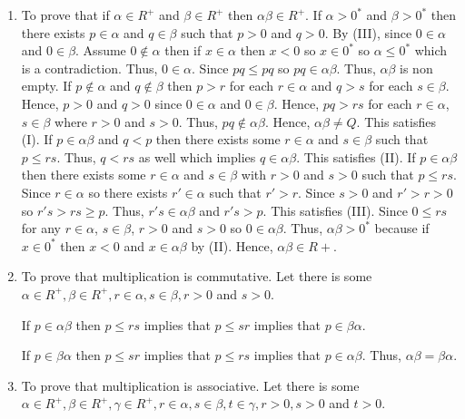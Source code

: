 \begin{enumerate}[{\bf Step 1.}]
\begin{enumerate}[(M1)]
    \item To prove that if $\alpha \in R^+$ and $\beta \in R^+$ then $\alpha \beta \in R^+$.
    \bigbreak \quad
    If $\alpha > 0^*$ and $\beta > 0^*$ then there exists $p \in \alpha$ and $q \in \beta$ such that $p > 0$ and $q > 0$. 
    By (III), since $0 \in \alpha$ and $0 \in \beta$.
    \bigbreak \quad
    Assume $0 \notin \alpha$ then if $x \in \alpha$ then $x < 0$ so $x \in 0^*$ so $\alpha \leq 0^*$ which is a contradiction. 
    Thus, $0 \in \alpha$.
    \bigbreak \quad
    Since $pq \leq pq$ so $pq \in \alpha \beta$. Thus, $\alpha \beta$ is non empty.
    \bigbreak \quad
    If $p \notin \alpha$ and $q \notin \beta$ then $p > r$ for each $r \in \alpha$ and $q > s$ for each $s \in \beta$.
    Hence, $p > 0$ and $q > 0$ since $0 \in \alpha$ and $0 \in \beta$.
    Hence, $pq > rs$ for each $r \in \alpha$, $s \in \beta$ where $r > 0$ and $s > 0$. Thus, $pq \notin \alpha \beta$.
    Hence, $\alpha \beta \neq Q$.
    This satisfies (I).
    \bigbreak \quad
    If $p \in \alpha \beta$ and $q < p$ then there exists some $r \in \alpha$ and $s \in \beta$ 
    such that $p \leq rs$. Thus, $q < rs$ as well which implies $q \in \alpha \beta$. This satisfies (II).
    \bigbreak \quad
    If $p \in \alpha \beta$ then there exists some $r \in \alpha$ and $s \in \beta$ with $r > 0$ and $s > 0$ 
    such that $p \leq rs$. Since $r \in  \alpha$ so there exists $r' \in \alpha$ such that $r' > r$.
    Since $s > 0$ and $r' > r > 0$ so $r's > rs \geq p$. Thus, $r's \in \alpha \beta$ and $r's > p$.
    This satisfies (III).
    \bigbreak \quad
    Since $0 \leq rs$ for any $r \in \alpha$, $s \in \beta$, $r > 0$ and $s > 0$ so $0 \in \alpha \beta$.
    Thus, $\alpha \beta > 0^*$ because if $x \in 0^*$ then $x < 0$ and $x \in \alpha \beta$ by (II). 
    \bigbreak \quad
    Hence, $\alpha \beta \in R+$.

    \item To prove that multiplication is commutative. 
    \bigbreak
    Let there is some $\alpha \in R^+, \beta \in R^+, r \in \alpha, s \in \beta, r > 0$ and $s > 0$.
    
    If $p \in \alpha \beta$ then $p \leq rs$ implies that $p \leq sr$ implies that $p \in \beta \alpha$.

    If $p \in \beta \alpha$ then $p \leq sr$ implies that $p \leq rs$ implies that $p \in \alpha \beta$.
    \bigbreak
    Thus, $\alpha \beta = \beta \alpha$.
    
    \item To prove that multiplication is associative. 
    \bigbreak
    Let there is some $\alpha \in R^+, \beta \in  R^+, \gamma \in R^+, r \in \alpha, s \in \beta, t \in \gamma, r > 0, s > 0$ and $t > 0$.


\end{enumerate}
\end{enumerate}
